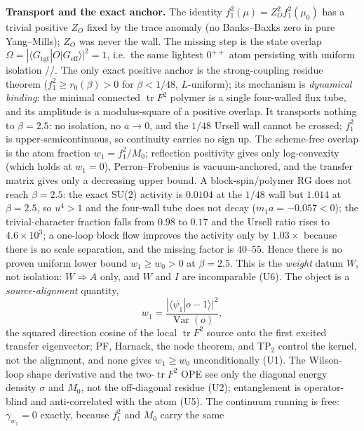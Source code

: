 \textbf{Transport and the exact anchor.} The identity $f_1^2(\mu)=Z_O^2f_1^2(\mu_0)$ has a trivial
positive $Z_O$ fixed by the trace anomaly (no Banks--Baxks zero in pure Yang--Mills); $Z_O$ was never
the wall. The missing step is the state overlap
$\Omega=|\langle G_{\mathrm{tgt}}|O|G_{\mathrm{eff}}\rangle|^2=1$, i.e.\ the same lightest $0^{++}$
atom persisting with uniform isolation \LT/\LC/\LM. The only exact positive anchor is the
strong-coupling residue theorem ($f_1^2\ge r_0(\beta)>0$ for $\beta<1/48$, $L$-uniform); its
mechanism is \emph{dynamical binding}: the minimal connected $\operatorname{tr}F^2$ polymer is a
single four-walled flux tube, and its amplitude is a modulus-square of a positive overlap. It
transports nothing to $\beta=2.5$: no isolation, no $a\to0$, and the $1/48$ Ursell wall cannot be
crossed; $f_1^2$ is upper-semicontinuous, so continuity carries no sign up. The scheme-free overlap
is the atom fraction $w_1=f_1^2/M_0$; reflection positivity gives only log-convexity (which holds at
$w_1=0$), Perron--Frobenius is vacuum-anchored, and the transfer matrix gives only a decreasing upper
bound. A block-spin/polymer RG does not reach $\beta=2.5$: the exact SU(2) activity is $0.0104$ at
the $1/48$ wall but $1.014$ at $\beta=2.5$, so $u^4>1$ and the four-wall tube does not decay
($m_1a=-0.057<0$); the trivial-character fraction falls from $0.98$ to $0.17$ and the Ursell ratio
rises to $4.6\times10^3$; a one-loop block flow improves the activity only by $1.03\times$ because
there is no scale separation, and the missing factor is $40$--$55$. Hence there is no proven uniform
lower bound $w_1\ge w_0>0$ at $\beta=2.5$. This is the \emph{weight} datum $W$, not isolation:
$W\Rightarrow A$ only, and $W$ and $I$ are incomparable (U6). The object is a
\emph{source-alignment} quantity,
\begin{equation}
  w_1=\frac{|\langle\psi_1|o-1\rangle|^2}{\operatorname{Var}(o)},
  \label{eq:v3alignment}
\end{equation}
the squared direction cosine of the local $\operatorname{tr}F^2$ source onto the first excited
transfer eigenvector; PF, Harnack, the node theorem, and TP$_2$ control the kernel, not the
alignment, and none gives $w_1\ge w_0$ unconditionally (U1). The Wilson-loop shape derivative and the
two-$\operatorname{tr}F^2$ OPE see only the diagonal energy density $\sigma$ and $M_0$, not the
off-diagonal residue (U2); entanglement is operator-blind and anti-correlated with the atom (U5).
The continuum running is free: $\gamma_{w_1}=0$ exactly, because $f_1^2$ and $M_0$ carry the same
